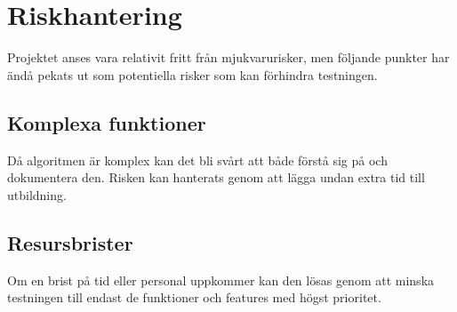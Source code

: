 \section{Riskhantering}
Projektet anses vara relativit fritt från mjukvarurisker, men följande punkter har ändå pekats ut som potentiella risker som kan förhindra testningen. 
\subsection{Komplexa funktioner}
Då algoritmen är komplex kan det bli svårt att både förstå sig på och dokumentera den. Risken kan hanterats genom att lägga undan extra tid till utbildning.

\subsection{Resursbrister}
Om en brist på tid eller personal uppkommer kan den lösas genom att minska testningen till endast de funktioner och features med högst prioritet.